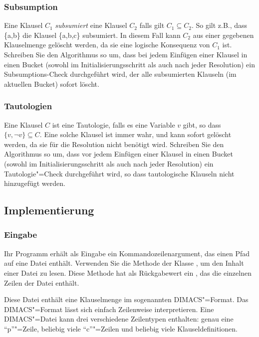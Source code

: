 \documentclass{sdqassignment}
\begin{document}
\subsubsection{Subsumption}
Eine Klausel $C_1$ \emph{subsumiert} eine Klausel $C_2$ falls gilt $C_1 \subseteq C_2$. So gilt z.B., dass \{a,b\} die Klausel \{a,b,c\} subsumiert. In diesem Fall kann $C_2$ aus einer gegebenen Klauselmenge gelöscht werden, da sie eine logische Konsequenz von $C_1$ ist. Schreiben Sie den Algorithmus so um, dass bei jedem Einfügen einer Klausel in einen Bucket (sowohl im Initialisierungsschritt als auch nach jeder Resolution) ein Subsumptions-Check durchgeführt wird, der alle subsumierten Klauseln (im aktuellen Bucket) sofort löscht.

\subsubsection{Tautologien}
\label{sec:tautology}
Eine Klausel $C$ ist eine Tautologie, falls es eine Variable $v$ gibt, so dass $\{v, \lnot v\} \subseteq C$. Eine solche Klausel ist immer wahr, und kann sofort gelöscht werden, da sie für die Resolution nicht benötigt wird. Schreiben Sie den Algorithmus so um, dass vor jedem Einfügen einer Klausel in einen Bucket (sowohl im Initialisierungsschritt als auch nach jeder Resolution) ein Tautologie"=Check durchgeführt wird, so dass tautologische Klauseln nicht hinzugefügt werden.

\subsection{Implementierung}
\subsubsection{Eingabe}
\label{sec:io}
Ihr Programm erhält als Eingabe ein Kommandozeilenargument, das einen Pfad auf eine Datei enthält. Verwenden Sie die Methode  der Klasse , um den Inhalt einer Datei zu lesen. Diese Methode hat als Rückgabewert ein , das die einzelnen Zeilen der Datei  enthält.

Diese Datei enthält eine Klauselmenge im sogenannten DIMACS"=Format. Das DIMACS"=Format lässt sich einfach Zeilenweise interpretieren. Eine DIMACS"=Datei kann drei verschiedene Zeilentypen enthalten: genau eine \enquote{p}"=Zeile, beliebig viele \enquote{c}"=Zeilen und beliebig viele Klauseldefinitionen.
\end{document}
